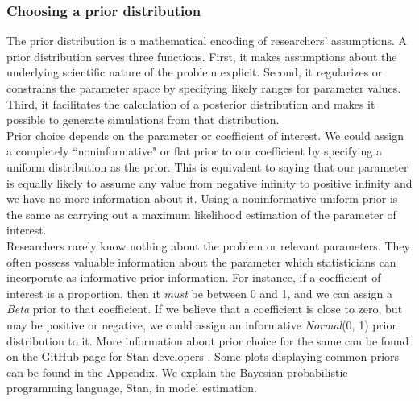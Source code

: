 \documentclass{article}
\begin{document}
\subsubsection{Choosing a prior distribution}
The prior distribution is a mathematical encoding of researchers' assumptions. A prior distribution serves three functions. First, it makes assumptions about the underlying scientific nature of the problem explicit. Second, it regularizes or constrains the parameter space by specifying likely ranges for parameter values. Third, it facilitates the calculation of a posterior distribution and makes it possible to generate simulations from that distribution. \\
Prior choice depends on the parameter or coefficient of interest.  We could assign a completely ``noninformative" or flat prior to our coefficient by specifying a uniform distribution as the prior. This is equivalent to saying that our parameter is equally likely to assume any value from negative infinity to positive infinity and we have no more information about it. Using a noninformative uniform prior is the same as carrying out a maximum likelihood estimation of the parameter of interest. \\
Researchers rarely know nothing about the problem or relevant parameters. They often possess valuable information about the parameter which statisticians can incorporate as informative prior information. For instance, if a coefficient of interest is a proportion, then it \emph{must} be between 0 and 1, and we can assign a \emph{Beta} prior to that coefficient.  If we believe that a coefficient is close to zero, but may be positive or negative, we could assign an informative \emph{Normal}(0, 1) prior distribution to it.  More information about prior choice for the same can be found on the GitHub page for Stan developers \cite{prior-choice}. Some plots displaying common priors can be found in the Appendix. We explain the Bayesian probabilistic programming language, Stan, in model estimation.
\end{document}
